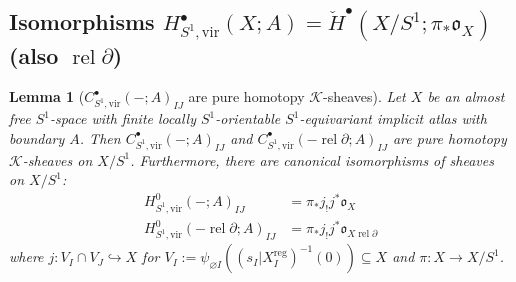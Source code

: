 \documentclass[12pt]{article}
\newtheorem{lemma}[theorem]{Lemma}
\theoremstyle{definition}
\theoremstyle{remark}
\numberwithin{equation}{subsection}
\newcommand{\K}{\mathcal K}
\newcommand{\oo}{\mathfrak o}
\newcommand{\cH}{\check H}
\newcommand{\vir}{\mathrm{vir}}
\newcommand{\reg}{\mathrm{reg}}
\newcommand{\rel}{\operatorname{rel}}
\begin{document}
\subsection{Isomorphisms \texorpdfstring{$H^\bullet_{S^1,\vir}(X;A)=\cH^\bullet(X/S^1;\pi_\ast\oo_X)$}{H\_S{\textasciicircum}1,vir(X;A)=H(X/S{\textasciicircum}1,pi o\_X)} (also \texorpdfstring{$\rel\partial$}{rel d})}

\begin{lemma}[$C^\bullet_{S^1,\vir}(-;A)_{IJ}$ are pure homotopy $\K$-sheaves]\label{CSTpureSS}
Let $X$ be an almost free $S^1$-space with finite locally $S^1$-orientable $S^1$-equivariant implicit atlas with boundary $A$.  Then $C^\bullet_{S^1,\vir}(-;A)_{IJ}$ and $C^\bullet_{S^1,\vir}(-\rel\partial;A)_{IJ}$ are pure homotopy $\K$-sheaves on $X/S^1$.  Furthermore, there are canonical isomorphisms of sheaves on $X/S^1$:
\begin{align}
H^0_{S^1,\vir}(-;A)_{IJ}&=\pi_\ast j_!j^\ast\oo_X\\
H^0_{S^1,\vir}(-\rel\partial;A)_{IJ}&=\pi_\ast j_!j^\ast\oo_{X\rel\partial}
\end{align}
where $j:V_I\cap V_J\hookrightarrow X$ for $V_I:=\psi_{\varnothing I}((s_I|X_I^\reg)^{-1}(0))\subseteq X$ and $\pi:X\to X/S^1$.
\end{lemma}
\end{document}
